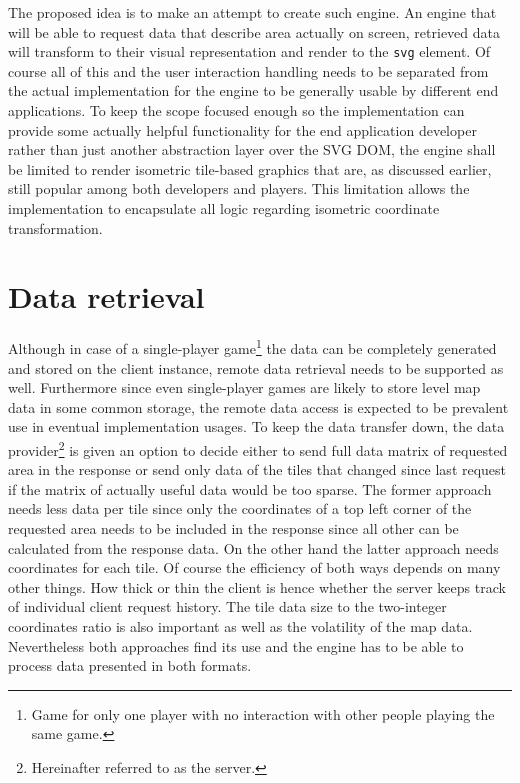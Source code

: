 \documentclass[11pt,oneside, final]{fithesis2}
\begin{document}
The proposed idea is to make an attempt to create such engine. An engine that will be able to request data that describe area actually on screen, retrieved data will transform to their visual representation and render to the \texttt{svg} element. Of course all of this and the user interaction handling needs to be separated from the actual implementation for the engine to be generally usable by different end applications. To keep the scope focused enough so the implementation can provide some actually helpful functionality for the end application developer rather than just another abstraction layer over the SVG DOM, the engine shall be limited to render isometric tile-based graphics that are, as discussed earlier, still popular among both developers and players. This limitation allows the implementation to encapsulate all logic regarding isometric coordinate transformation.

\section{Data retrieval}
\label{datadesign}
Although in case of a single-player game\footnote{Game for only one player with no interaction with other people playing the same game.} the data can be completely generated and stored on the client instance, remote data retrieval needs to be supported as well. Furthermore since even single-player games are likely to store level map data in some common storage, the remote data access is expected to be prevalent use in eventual implementation usages. To keep the data transfer down, the data provider\footnote{Hereinafter referred to as the server.} is given an option to decide either to send full data matrix of requested area in the response or send only data of the tiles that changed since last request if the matrix of actually useful data would be too sparse. The former approach needs less data per tile since only the coordinates of a top left corner of the requested area needs to be included in the response since all other can be calculated from the response data. On the other hand the latter approach needs coordinates for each tile. Of course the efficiency of both ways depends on many other things. How thick or thin the client is hence whether the server keeps track of individual client request history. The tile data size to the two-integer coordinates ratio is also important as well as the volatility of the map data. Nevertheless both approaches find its use and the engine has to be able to process data presented in both formats.
\end{document}
